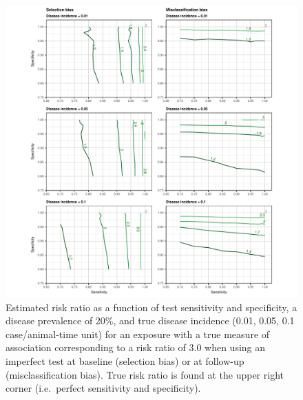 \documentclass[utf8]{frontiers_suppmat} %
\begin{document}
\begin{figure}[htbp]
  \begin{center}
    \includegraphics[scale=.95]{master-risk20_contourX-1}
    \end{center}
  \caption{Estimated risk ratio as a function of test sensitivity and
    specificity, a disease prevalence of 20\%, and true disease incidence (0.01,
    0.05, 0.1 case/animal-time unit) for an exposure with a true measure of
    association corresponding to a risk ratio of \(3.0\) when using an imperfect
    test at baseline (selection bias) or at follow-up (misclassification bias).
    True risk ratio is found at the upper right corner (i.e.\ perfect
    sensitivity and specificity).}
  \label{fig:risk_contourX20}
\end{figure}
\end{document}
